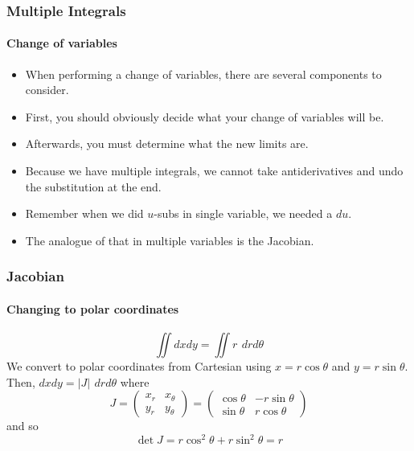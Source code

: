 \documentclass[xcolor=svgnames]{beamer}
\begin{document}
\begin{frame}
\frametitle{Multiple Integrals}
\framesubtitle{Change of variables}
\begin{itemize}
\item When performing a change of variables, there are several components to consider.
\item First, you should obviously decide what your change of variables will be. 
\item Afterwards, you must determine what the new limits are. 
\item Because we have multiple integrals, we cannot take antiderivatives and undo the substitution at the end. 
\item Remember when we did $u$-subs in single variable, we needed a $du$. 
\item The analogue of that in multiple variables is the Jacobian. 
\end{itemize}
\end{frame}
\begin{frame}
\frametitle{Jacobian}
\framesubtitle{Changing to polar coordinates}
\[
\iint dx dy = \iint r \, \ dr d\theta
\]
We convert to polar coordinates from Cartesian using $x = r \cos \theta$ and $y = r \sin \theta$. Then, $dx dy = |J| \, \ dr d\theta$ where
\[
J = \begin{pmatrix}
x_r & x_\theta \\
y_r & y_\theta
\end{pmatrix}
= \begin{pmatrix}
\cos \theta & -r \sin \theta \\
\sin \theta & r \cos \theta
\end{pmatrix}
\]
and so
\[
\det J = r \cos^2 \theta + r \sin^2 \theta = r
\]
\end{frame}
\end{document}
